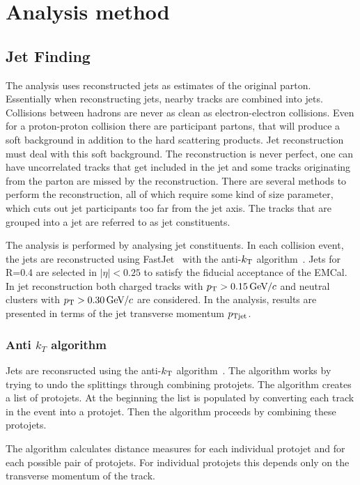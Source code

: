 \section{Analysis method}
\label{sec:methods}
\subsection{Jet Finding}
The analysis uses reconstructed jets as estimates of the original parton. Essentially when reconstructing jets, nearby tracks are combined into jets. Collisions between hadrons are never as clean as electron-electron collisions. Even for a proton-proton collision there are participant partons, that will produce a soft background in addition to the hard scattering products. Jet reconstruction must deal with this soft background. The reconstruction is never perfect, one can have uncorrelated tracks that get included in the jet and some tracks originating from the parton are missed by the reconstruction. There are several methods to perform the reconstruction, all of which require some kind of size parameter, which cuts out jet participants too far from the jet axis. The tracks that are grouped into a jet are referred to as jet constituents. 

The analysis is performed by analysing jet constituents. In each collision event, the jets are reconstructed using FastJet~\cite{fastjet} with the anti-$k_{\rm T}$ algorithm~\cite{antikt}. Jets for R=0.4 are selected in $\left| \eta \right| < 0.25 $ to satisfy the fiducial acceptance of the EMCal. In jet reconstruction both charged tracks with $p_{\rm T}>0.15\,\mathrm{GeV}\kern-0.05em/\kern-0.02em c$ and neutral clusters with $p_{\rm T}>0.30\,\mathrm{GeV}\kern-0.05em/\kern-0.02em c$ are considered. In the analysis, results are presented in terms of the jet transverse momentum $p_{\rm Tjet}$.

\subsubsection{Anti $k_T$ algorithm}
Jets are reconsructed using the anti-$k_{\rm T}$ algorithm~\cite{antikt}. The algorithm works by trying to undo the splittings through combining protojets. The algorithm creates a list of protojets. At the beginning the list is populated by converting each track in the event into a protojet. Then the algorithm proceeds by combining these protojets.

The algorithm calculates distance measures for each individual protojet and for each possible pair of protojets. For individual protojets this depends only on the transverse momentum of the track.

